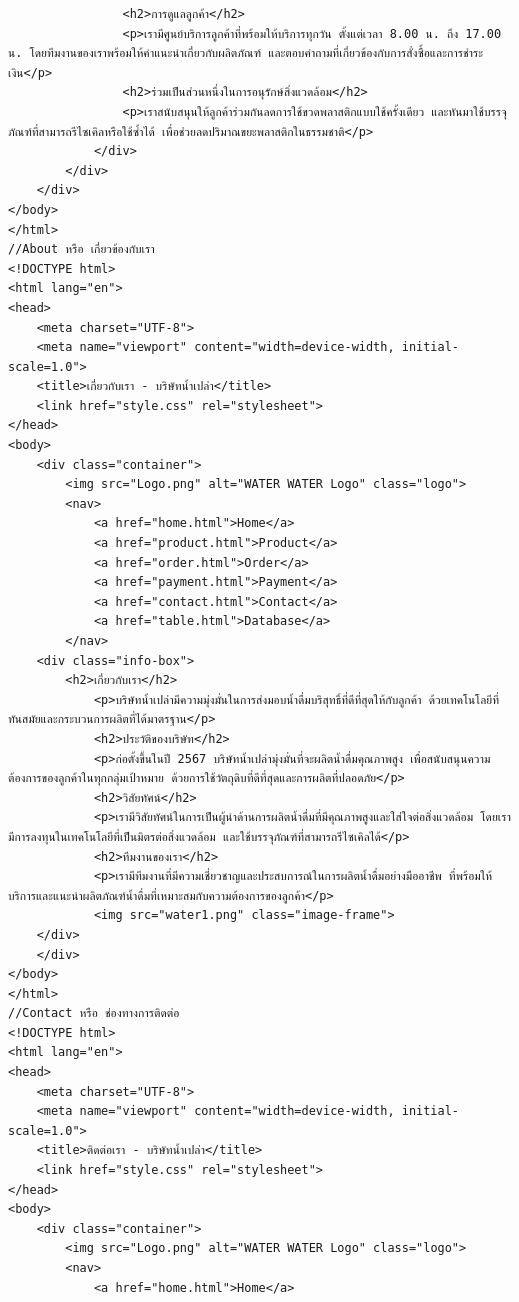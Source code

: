 \documentclass{report}
\begin{document}
\begin{verbatim}
                <h2>การดูแลลูกค้า</h2>
                <p>เรามีศูนย์บริการลูกค้าที่พร้อมให้บริการทุกวัน ตั้งแต่เวลา 8.00 น. ถึง 17.00 น. โดยทีมงานของเราพร้อมให้คำแนะนำเกี่ยวกับผลิตภัณฑ์ และตอบคำถามที่เกี่ยวข้องกับการสั่งซื้อและการชำระเงิน</p>
                <h2>ร่วมเป็นส่วนหนึ่งในการอนุรักษ์สิ่งแวดล้อม</h2>
                <p>เราสนับสนุนให้ลูกค้าร่วมกันลดการใช้ขวดพลาสติกแบบใช้ครั้งเดียว และหันมาใช้บรรจุภัณฑ์ที่สามารถรีไซเคิลหรือใช้ซ้ำได้ เพื่อช่วยลดปริมาณขยะพลาสติกในธรรมชาติ</p>
            </div>
        </div>
    </div>
</body>
</html>
//About หรือ เกี่ยวข้องกับเรา
<!DOCTYPE html>
<html lang="en">
<head>
    <meta charset="UTF-8">
    <meta name="viewport" content="width=device-width, initial-scale=1.0">
    <title>เกี่ยวกับเรา - บริษัทน้ำเปล่า</title>
    <link href="style.css" rel="stylesheet">
</head>
<body>
    <div class="container">
        <img src="Logo.png" alt="WATER WATER Logo" class="logo">
        <nav>
            <a href="home.html">Home</a>
            <a href="product.html">Product</a>
            <a href="order.html">Order</a>
            <a href="payment.html">Payment</a>
            <a href="contact.html">Contact</a>
            <a href="table.html">Database</a>
        </nav>
    <div class="info-box">
        <h2>เกี่ยวกับเรา</h2>
            <p>บริษัทน้ำเปล่ามีความมุ่งมั่นในการส่งมอบน้ำดื่มบริสุทธิ์ที่ดีที่สุดให้กับลูกค้า ด้วยเทคโนโลยีที่ทันสมัยและกระบวนการผลิตที่ได้มาตรฐาน</p>
            <h2>ประวัติของบริษัท</h2>
            <p>ก่อตั้งขึ้นในปี 2567 บริษัทน้ำเปล่ามุ่งมั่นที่จะผลิตน้ำดื่มคุณภาพสูง เพื่อสนับสนุนความต้องการของลูกค้าในทุกกลุ่มเป้าหมาย ด้วยการใช้วัตถุดิบที่ดีที่สุดและการผลิตที่ปลอดภัย</p>
            <h2>วิสัยทัศน์</h2>
            <p>เรามีวิสัยทัศน์ในการเป็นผู้นำด้านการผลิตน้ำดื่มที่มีคุณภาพสูงและใส่ใจต่อสิ่งแวดล้อม โดยเรามีการลงทุนในเทคโนโลยีที่เป็นมิตรต่อสิ่งแวดล้อม และใช้บรรจุภัณฑ์ที่สามารถรีไซเคิลได้</p>
            <h2>ทีมงานของเรา</h2>
            <p>เรามีทีมงานที่มีความเชี่ยวชาญและประสบการณ์ในการผลิตน้ำดื่มอย่างมืออาชีพ ที่พร้อมให้บริการและแนะนำผลิตภัณฑ์น้ำดื่มที่เหมาะสมกับความต้องการของลูกค้า</p>
            <img src="water1.png" class="image-frame">
    </div>
    </div>
</body>
</html>
//Contact หรือ ช่องทางการติดต่อ
<!DOCTYPE html>
<html lang="en">
<head>
    <meta charset="UTF-8">
    <meta name="viewport" content="width=device-width, initial-scale=1.0">
    <title>ติดต่อเรา - บริษัทน้ำเปล่า</title>
    <link href="style.css" rel="stylesheet">
</head>
<body>
    <div class="container">
        <img src="Logo.png" alt="WATER WATER Logo" class="logo">
        <nav>
            <a href="home.html">Home</a>

\end{verbatim}
\end{document}
